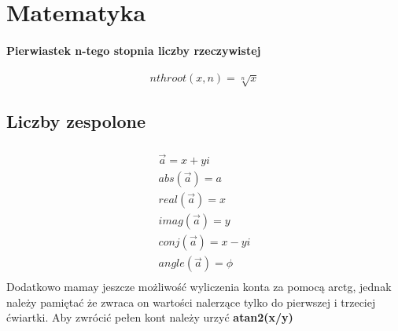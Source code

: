 \documentclass[16pt]{article}
\begin{document}
    \section{Matematyka}
        \paragraph*{Pierwiastek n-tego stopnia liczby rzeczywistej}
            \begin{equation*}
                nthroot(x, n) = \sqrt[n]{x}    
            \end{equation*}
            
        \subsection*{Liczby zespolone}
            \begin{multline*}
                \\\vec{a}= x+yi\\
                abs(\vec{a})= a\\
                real(\vec{a})= x\\
                imag(\vec{a})= y\\
                conj(\vec{a})= x-yi\\
                angle(\vec{a})= \phi\\
            \end{multline*}
            Dodatkowo mamay jeszcze możliwość wyliczenia konta za pomocą arctg, jednak należy pamiętać że zwraca on wartości nalerzące tylko do pierwszej i trzeciej ćwiartki.
            Aby zwrócić pełen kont należy urzyć \textbf{atan2(x/y)}
\end{document}
